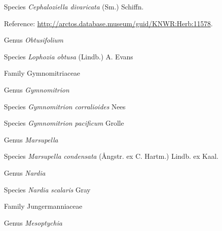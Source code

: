 \documentclass[9pt, article]{memoir}
\begin{document}
\begin{multicols}{2}
\vspace{6pt}\noindent\hspace{36pt}Species \textit{Cephaloziella divaricata} (Sm.) Schiffn.


Reference: 
\url{http://arctos.database.museum/guid/KNWR:Herb:11578}.

\vspace{6pt}\noindent\hspace{30pt}Genus \textit{Obtusifolium}


\vspace{6pt}\noindent\hspace{36pt}Species \textit{Lophozia obtusa} (Lindb.) A. Evans


\vspace{6pt}\noindent\hspace{24pt}Family Gymnomitriaceae


\vspace{6pt}\noindent\hspace{30pt}Genus \textit{Gymnomitrion}


\vspace{6pt}\noindent\hspace{36pt}Species \textit{Gymnomitrion corralioides} Nees


\vspace{6pt}\noindent\hspace{36pt}Species \textit{Gymnomitrion pacificum} Grolle


\vspace{6pt}\noindent\hspace{30pt}Genus \textit{Marsupella}


\vspace{6pt}\noindent\hspace{36pt}Species \textit{Marsupella condensata} (Ångstr. ex C. Hartm.) Lindb. ex Kaal.


\vspace{6pt}\noindent\hspace{30pt}Genus \textit{Nardia}


\vspace{6pt}\noindent\hspace{36pt}Species \textit{Nardia scalaris} Gray


\vspace{6pt}\noindent\hspace{24pt}Family Jungermanniaceae


\vspace{6pt}\noindent\hspace{30pt}Genus \textit{Mesoptychia}



\end{multicols}
\end{document}

